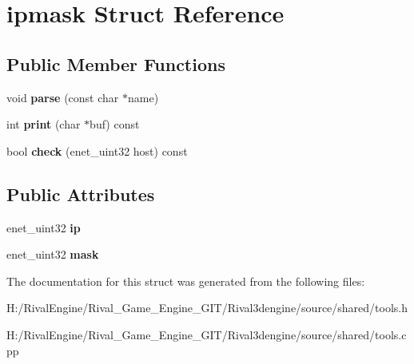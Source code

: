 \hypertarget{structipmask}{}\section{ipmask Struct Reference}
\label{structipmask}
\subsection*{Public Member Functions}
\begin{DoxyCompactItemize}
\item 
\mbox{\label{structipmask_a03bc38e3986d8eb7ea75dec61ee3d587}} 
void {\bfseries parse} (const char $\ast$name)
\item 
\mbox{\label{structipmask_ab0fb974fff1031e73ee9ecbf11c94d8d}} 
int {\bfseries print} (char $\ast$buf) const
\item 
\mbox{\label{structipmask_abda62f3540c9913532d62f08d1193a98}} 
bool {\bfseries check} (enet\+\_\+uint32 host) const
\end{DoxyCompactItemize}
\subsection*{Public Attributes}
\begin{DoxyCompactItemize}
\item 
\mbox{\label{structipmask_ab668a113e7a9d03e1998659ca170793f}} 
enet\+\_\+uint32 {\bfseries ip}
\item 
\mbox{\label{structipmask_ae794da6eb7cb8dd240e3bb13c3c6403a}} 
enet\+\_\+uint32 {\bfseries mask}
\end{DoxyCompactItemize}


The documentation for this struct was generated from the following files\+:\begin{DoxyCompactItemize}
\item 
H\+:/\+Rival\+Engine/\+Rival\+\_\+\+Game\+\_\+\+Engine\+\_\+\+G\+I\+T/\+Rival3dengine/source/shared/tools.\+h\item 
H\+:/\+Rival\+Engine/\+Rival\+\_\+\+Game\+\_\+\+Engine\+\_\+\+G\+I\+T/\+Rival3dengine/source/shared/tools.\+cpp\end{DoxyCompactItemize}
